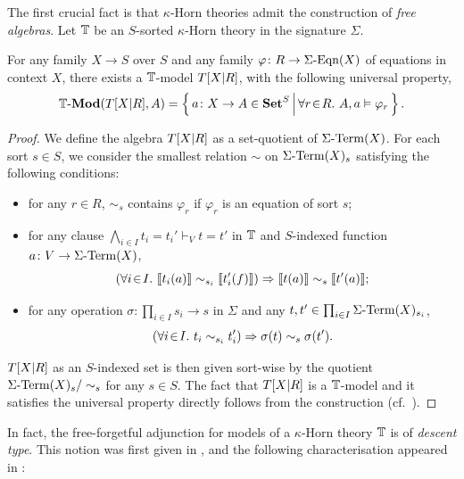 The first crucial fact is that $\kappa$-Horn theories admit the construction of \emph{free algebras}. Let $\mathbb{T}$ be an $S$-sorted $\kappa$-Horn theory in the signature $\Sigma$.

\begin{lemma}\label{lem:freealgebraexist}
  For any family $X \to S$ over $S$ and any family $\varphi \colon R \to \Sigma\text{-}\mathrm{Eqn}(X)$ of equations in context $X$, there exists a $\mathbb{T}$-model $T[X|R]$, with the following universal property,
  \[ \mathbb{T}\text{-}\mathbf{Mod}(T[X|R],A) = \left\{\,a \colon X \to A \in \mathbf{Set}^S\,\middle|\,\forall r\!\in\!R.\  A,a \vDash \varphi_r\,\right\}. \]
\end{lemma}
\begin{proof}
  We define the algebra $T[X|R]$ as a set-quotient of $\Sigma\text{-}\mathrm{Term}(X)$. For each sort $s\in S$, we consider the smallest relation $\sim$ on $\Sigma\text{-}\mathrm{Term}(X)_s$ satisfying the following conditions:
  \begin{itemize}
    \item for any $r\in R$, $\sim_s$ contains $\varphi_r$ if $\varphi_r$ is an equation of sort $s$;
    \item for any clause $\bigwedge_{i\in I} t_i = t_i' \vdash_V t = t'$ in $\mathbb{T}$ and $S$-indexed function $a \colon V \to \Sigma\text{-}\mathrm{Term}(X)$,
    \[ \left(\forall i\!\in\!I.\  \llbracket t_i(a)\rrbracket \sim_{s_i} \llbracket t'_i(f)\rrbracket\right) \Rightarrow \llbracket t(a)\rrbracket \sim_s \llbracket t'(a)\rrbracket; \]
    \item for any operation $\sigma \colon \prod_{i\in I}s_i \to s$ in $\Sigma$ and any $t,t' \in \prod_{i\in I}\Sigma\text{-}\mathrm{Term}(X)_{s_i}$, 
    \[ \left(\forall i\!\in\!I.\  t_i \sim_{s_i} t'_i\right) \Rightarrow \sigma(t) \sim_s \sigma(t'). \]
  \end{itemize}
  $T[X|R]$ as an $S$-indexed set is then given sort-wise by the quotient $\Sigma\text{-}\mathrm{Term}(X)_s/\sim_s$ for any $s\in S$. The fact that $T[X|R]$ is a $\mathbb{T}$-model and it satisfies the universal property directly follows from the construction (cf.~\citet[Rem.~3.32 \&~3.6]{adamek1994locally}).
\end{proof}

In fact, the free-forgetful adjunction for models of a $\kappa$-Horn theory $\mathbb{T}$ is of \emph{descent type}. This notion was first given in \citet{BarrMichael1985Ttat}, and the following characterisation appeared in \citet{kelly1993adjunctions}:

